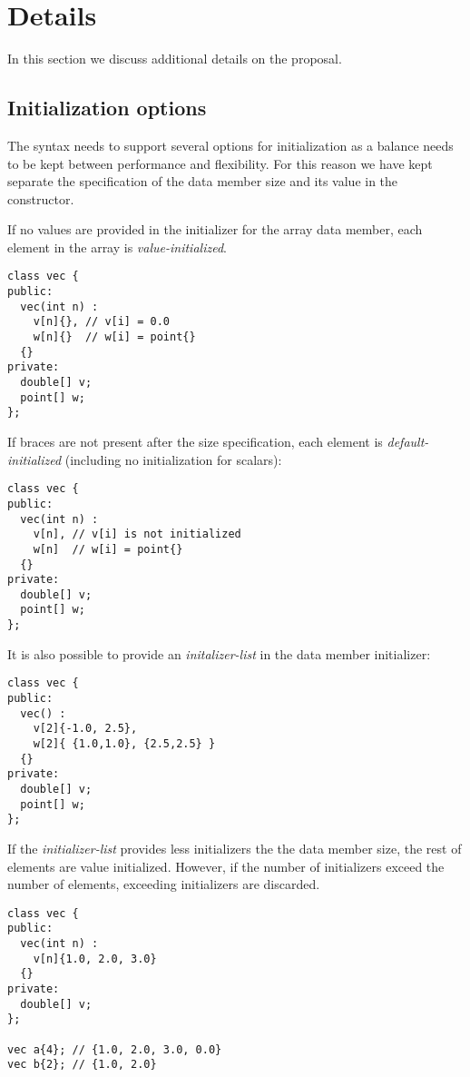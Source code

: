 \section{Details}

In this section we discuss additional details on the proposal.

\subsection{Initialization options}

The syntax needs to support several options for initialization as a balance
needs to be kept between performance and flexibility. For this reason we have
kept separate the specification of the data member size and its value in the
constructor.

If no values are provided in the initializer for the array data member, each
element in the array is \emph{value-initialized}.

\begin{lstlisting}
class vec {
public:
  vec(int n) : 
    v[n]{}, // v[i] = 0.0
    w[n]{}  // w[i] = point{}
  {}
private:
  double[] v;
  point[] w;
};
\end{lstlisting}

If braces are not present after the size specification, each element is
\emph{default-initialized} (including no initialization for scalars):


\begin{lstlisting}
class vec {
public:
  vec(int n) : 
    v[n], // v[i] is not initialized
    w[n]  // w[i] = point{}
  {}
private:
  double[] v;
  point[] w;
};
\end{lstlisting}

It is also possible to provide an \emph{initalizer-list} in the data member initializer:

\begin{lstlisting}
class vec {
public:
  vec() : 
    v[2]{-1.0, 2.5}, 
    w[2]{ {1.0,1.0}, {2.5,2.5} }
  {}
private:
  double[] v;
  point[] w;
};
\end{lstlisting}

If the \emph{initializer-list} provides less initializers the the data member
size, the rest of elements are value initialized. However, if the number of
initializers exceed the number of elements, exceeding initializers are
discarded.

\begin{lstlisting}
class vec {
public:
  vec(int n) :
    v[n]{1.0, 2.0, 3.0}
  {}
private:
  double[] v;
};

vec a{4}; // {1.0, 2.0, 3.0, 0.0}
vec b{2}; // {1.0, 2.0}
\end{lstlisting}

